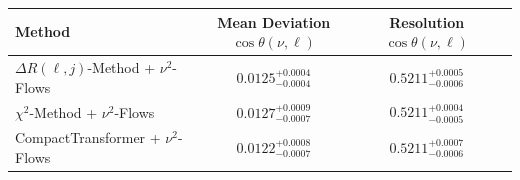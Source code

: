     \begin{tabular}{lccc}
        \toprule
        Method & Mean Deviation $\cos\theta(\nu, \ell)$ & Resolution $\cos\theta(\nu, \ell)$ \\
        \midrule
        $\Delta R(\ell,j)$-Method + $\nu^2$-Flows & $0.0125^{+0.0004}_{-0.0004}$ & $0.5211^{+0.0005}_{-0.0006}$ \\
        $\chi^2$-Method + $\nu^2$-Flows & $0.0127^{+0.0009}_{-0.0007}$ & $0.5211^{+0.0004}_{-0.0005}$ \\
        CompactTransformer + $\nu^2$-Flows & $0.0122^{+0.0008}_{-0.0007}$ & $0.5211^{+0.0007}_{-0.0006}$ \\
        \bottomrule
    \end{tabular}